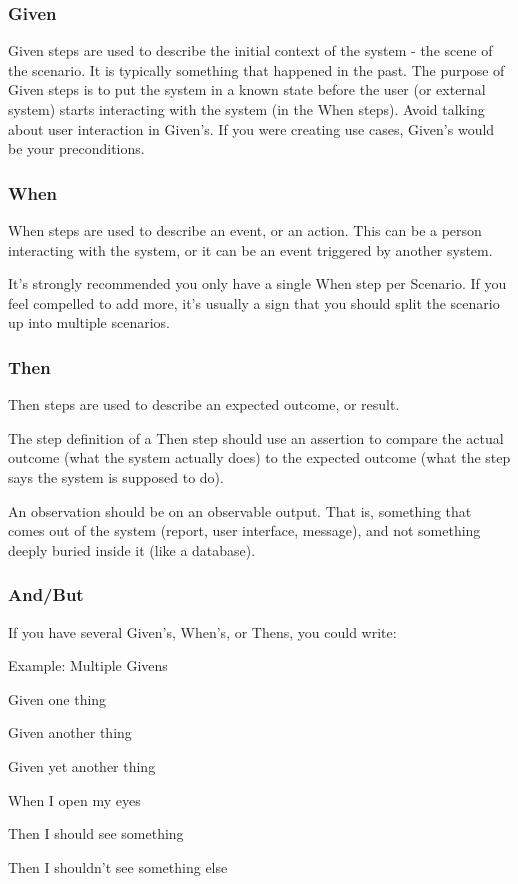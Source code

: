 \documentclass[conference]{IEEEtran}
\begin{document}
\subsubsection{Given}
Given steps are used to describe the initial context of the system - the scene of the scenario. It is typically something that happened in the past. The purpose of Given steps is to put the system in a known state before the user (or external system) starts interacting with the system (in the When steps). Avoid talking about user interaction in Given’s. If you were creating use cases, Given’s would be your preconditions.

\subsubsection{When}
When steps are used to describe an event, or an action. This can be a person interacting with the system, or it can be an event triggered by another system.

It’s strongly recommended you only have a single When step per Scenario. If you feel compelled to add more, it’s usually a sign that you should split the scenario up into multiple scenarios.

\subsubsection{Then}
Then steps are used to describe an expected outcome, or result.

The step definition of a Then step should use an assertion to compare the actual outcome (what the system actually does) to the expected outcome (what the step says the system is supposed to do).

An observation should be on an observable output. That is, something that comes out of the system (report, user interface, message), and not something deeply buried inside it (like a database).

\subsubsection{And/But}
If you have several Given’s, When’s, or Thens, you could write:\cite{a1}

\begin{list}{*}{spacing}
	\item Example: Multiple Givens
	\item Given one thing
	\item Given another thing
	\item Given yet another thing
	\item When I open my eyes
	\item Then I should see something
	\item Then I shouldn't see something else
\end{list}
\end{document}
